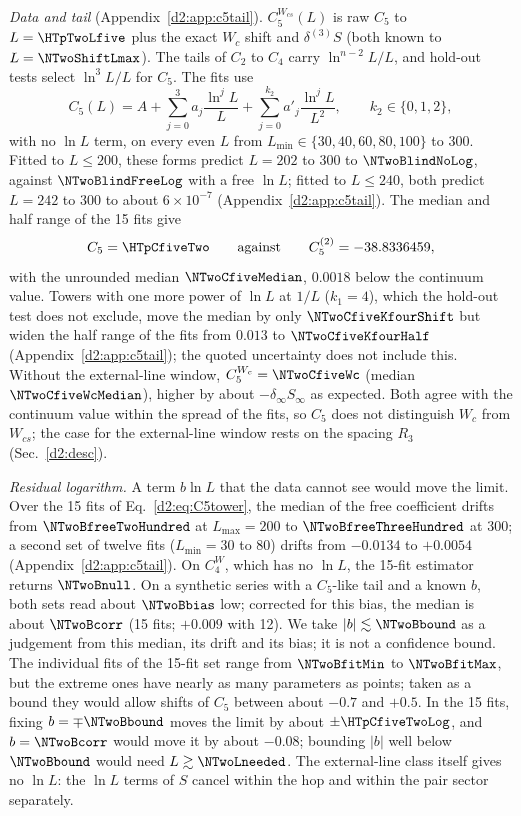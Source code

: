 \emph{Data and tail} (Appendix~\ref{d2:app:c5tail}). $C_5^{W_{cs}}(L)$ is raw $C_5$ to $L=\HTpTwoLfive$ plus the exact $W_c$ shift and $\delta^{(3)}S$ (both
known to $L=\NTwoShiftLmax$). The tails of $C_2$ to $C_4$ carry $\ln^{n-2}L/L$, and hold-out tests select $\ln^3L/L$ for $C_5$. The
fits use
\begin{equation}
 C_5(L)=A+\sum_{j=0}^{3}a_j\frac{\ln^jL}{L}+\sum_{j=0}^{k_2}a'_j\frac{\ln^jL}{L^2},\qquad k_2\in\{0,1,2\},
 \label{d2:eq:C5tower}
\end{equation}
with no $\ln L$ term, on every even $L$ from $L_{\min}\in\{30,40,60,80,100\}$ to 300. Fitted to $L\le200$, these forms
predict $L=202$ to 300 to $\NTwoBlindNoLog$, against $\NTwoBlindFreeLog$ with a free $\ln L$; fitted to $L\le240$, both
predict $L=242$ to 300 to about $6\times10^{-7}$ (Appendix~\ref{d2:app:c5tail}). The median and half range
of the 15 fits give
\begin{equation}
 C_5=\HTpCfiveTwo\qquad\text{against}\qquad C_5^{(2)}=-38.8336459 ,
 \label{d2:eq:C5}
\end{equation}
with the unrounded median $\NTwoCfiveMedian$, $0.0018$ below the continuum value. Towers with one more power of $\ln L$
at $1/L$ ($k_1=4$), which the hold-out test does not exclude, move the median by only $\NTwoCfiveKfourShift$ but widen the half range
of the fits from $0.013$ to $\NTwoCfiveKfourHalf$ (Appendix~\ref{d2:app:c5tail}); the quoted uncertainty does not include
this. Without the external-line window,
$C_5^{W_c}=\NTwoCfiveWc$ (median $\NTwoCfiveWcMedian$), higher by about $-\delta_\infty S_\infty$ as expected. Both agree
with the continuum value within the spread of the fits, so $C_5$ does not distinguish $W_c$ from $W_{cs}$; the case for
the external-line window rests on the spacing $R_3$ (Sec.~\ref{d2:desc}).

\emph{Residual logarithm.}\label{d2:c5log} A term $b\ln L$ that the data cannot see would move the limit. Over the 15
fits of Eq.~\eqref{d2:eq:C5tower}, the median of the free coefficient drifts from $\NTwoBfreeTwoHundred$ at $L_{\max}=200$
to $\NTwoBfreeThreeHundred$ at 300; a second set of twelve fits ($L_{\min}=30$ to 80) drifts from $-0.0134$ to $+0.0054$
(Appendix~\ref{d2:app:c5tail}). On $C_4^W$, which has no $\ln L$, the 15-fit estimator returns $\NTwoBnull$. On a synthetic
series with a $C_5$-like tail and a known $b$, both sets read about $\NTwoBbias$ low; corrected for this bias, the median
is about $\NTwoBcorr$ (15 fits; $+0.009$ with 12). We take $|b|\lesssim\NTwoBbound$ as a judgement from this median, its
drift and its bias; it is not a confidence bound. The individual fits of the 15-fit set range from $\NTwoBfitMin$ to
$\NTwoBfitMax$, but the extreme ones have nearly as many parameters as points; taken as a bound they would allow shifts of
$C_5$ between about $-0.7$ and $+0.5$. In the 15 fits, fixing $b=\mp\NTwoBbound$ moves the limit by about
$\pm\HTpCfiveTwoLog$, and $b=\NTwoBcorr$ would move it by about $-0.08$; bounding $|b|$ well below $\NTwoBbound$ would
need $L\gtrsim\NTwoLneeded$. The external-line class itself gives no $\ln L$: the
$\ln L$ terms of $S$ cancel within the hop and within the pair sector separately.

